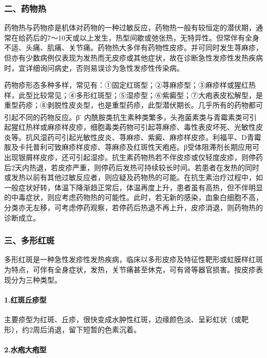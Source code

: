 \subsubsection{二、药物热}

药物热与药物疹是机体对药物的一种过敏反应，药物热一般有较恒定的潜伏期，通常在给药后的7～10天或以上发生，热型间歇或弛张热，无特异性。但常伴有全身不适、头痛、肌痛、关节痛。药物热大多伴有药物性皮疹。并可同时发生荨麻疹，但亦有少数病例仅表现为发热而无皮疹或其他症状，故在诊断急性发疹性发热疾病时，宜详细询问病史，否则易误诊为急性发疹性传染病。

药物疹形态多种多样，常见有：①固定红斑型；②荨麻疹型；③麻疹样或猩红热样，此型比较常见；④多形红斑型；⑤湿疹型；⑥紫癜型；⑦大疱表皮松解型，是重型药疹；⑧剥脱性皮炎型，也是重型药疹，此型潜伏期长。几乎所有的药物都可引起不同的药物反应。β\textsuperscript{-}
内酰胺类抗生素种类繁多，头孢菌素类与青霉素类可引起猩红热样或麻疹样皮疹，细胞毒类药物可引起荨麻疹、毒性表皮坏死、光敏性皮炎等。抗风湿药可引起光敏性皮炎、荨麻疹、紫癜、麻疹样皮疹。利福平、D青霉胺及卡托普利可致麻疹样皮疹、荨麻疹及红斑性天疱疮。β受体阻滞剂长期应用可出现银屑样皮疹，还可引起湿疹。抗生素药物热若不伴皮疹或仅轻度皮疹，则停药后2天内热退，若皮疹严重，则停药后发热可持续较长时间。若患者在发热的同时或发热以前有其他过敏反应者，则应疑及药物热的可能。在抗生素治疗过程中，如一般症状好转，体温下降渐趋正常后，体温再度上升，患者虽有高热，但不伴明显的中毒症状，则应考虑药物热的可能性。此时，若无新的感染，血象白细胞不高，分类亦无左移，可考虑停药观察，若停药后热退不再上升，皮疹消退，则药物热的诊断成立。

\subsubsection{三、多形红斑}

多形红斑是一种急性发疹性发热疾病，临床以多形皮疹及特征性靶形或虹膜样红斑为特点，可伴有全身症状，发热，关节痛甚至休克，可有肾等器官损害。按皮疹表现分为三种类型。

\paragraph{1.红斑丘疹型}

主要疹型为红斑、丘疹，很快变成水肿性红斑，边缘颜色淡、呈彩虹状（或靶形），约2周后消退，留下短暂的色素沉着。

\paragraph{2.水疱大疱型}

